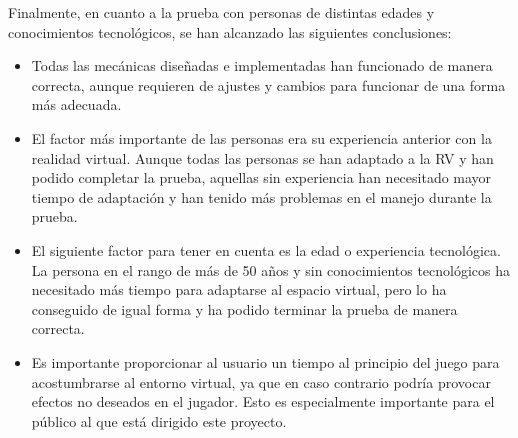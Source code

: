 Finalmente, en cuanto a la prueba con personas de distintas edades y conocimientos tecnológicos, se han alcanzado las siguientes conclusiones:

\begin{itemize}
	
	
	\item{Todas las mecánicas diseñadas e implementadas han funcionado de manera correcta, aunque requieren de ajustes y cambios para funcionar de una forma más adecuada.}
	\item{El factor más importante de las personas era su experiencia anterior con la realidad virtual. Aunque todas las personas se han adaptado a la RV y han podido completar la prueba, aquellas sin experiencia han necesitado mayor tiempo de adaptación y han tenido más problemas en el manejo durante la prueba.}
	\item{El siguiente factor para tener en cuenta es la edad o experiencia tecnológica. La persona en el rango de más de 50 años y sin conocimientos tecnológicos ha necesitado más tiempo para adaptarse al espacio virtual, pero lo ha conseguido de igual forma y ha podido terminar la prueba de manera correcta.}
	\item{Es importante proporcionar al usuario un tiempo al principio del juego para acostumbrarse al entorno virtual, ya que en caso contrario podría provocar efectos no deseados en el jugador. Esto es especialmente importante para el público al que está dirigido este proyecto.}
\end{itemize}



